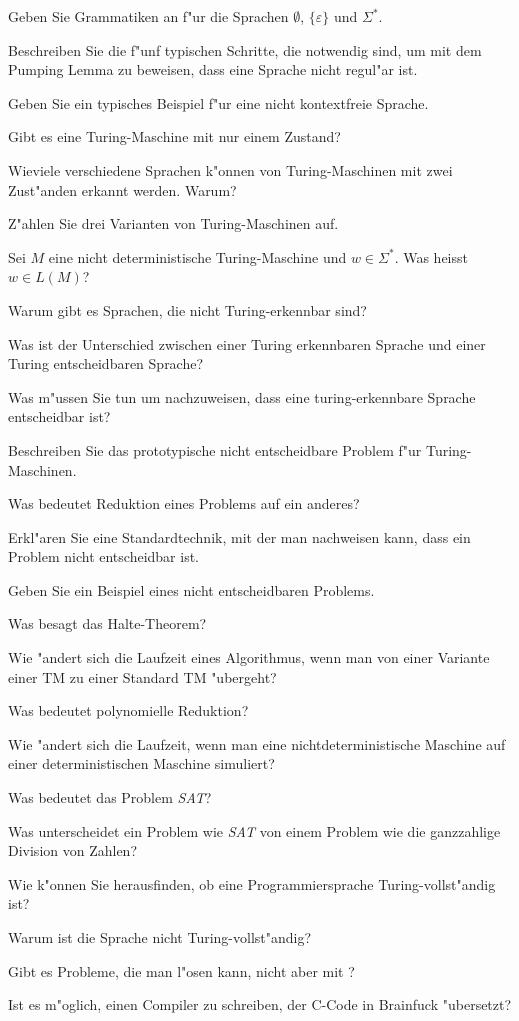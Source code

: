 \documentclass[a4paper,12pt,twocolumn]{article}
\begin{document}
\begin{compactenum}
\item Geben Sie Grammatiken an f"ur die Sprachen $\emptyset$,
$\{\varepsilon\}$ und $\Sigma^*$.
\item Beschreiben Sie die f"unf typischen Schritte, die notwendig sind,
um mit dem Pumping Lemma zu beweisen, dass eine Sprache nicht regul"ar ist.
\item Geben Sie ein typisches Beispiel f"ur eine nicht kontextfreie Sprache.
\item Gibt es eine Turing-Maschine mit nur einem Zustand?
\item Wieviele verschiedene Sprachen k"onnen von 
Turing-Maschinen mit zwei Zust"anden erkannt werden. Warum?
\item Z"ahlen Sie drei Varianten von Turing-Maschinen auf.
\item Sei $M$ eine nicht deterministische Turing-Maschine und $w\in\Sigma^*$.
Was heisst $w\in L(M)$?
\item Warum gibt es Sprachen, die nicht Turing-erkennbar sind?
\item Was ist der Unterschied zwischen einer Turing erkennbaren Sprache
und einer Turing entscheidbaren Sprache?
\item Was m"ussen Sie tun um nachzuweisen, dass eine turing-erkennbare
Sprache entscheidbar ist?
\item Beschreiben Sie das prototypische nicht entscheidbare Problem f"ur
Turing-Maschinen.
\item Was bedeutet Reduktion eines Problems auf ein anderes?
\item Erkl"aren Sie eine Standardtechnik, mit der man nachweisen kann,
dass ein Problem nicht entscheidbar ist.
\item Geben Sie ein Beispiel eines nicht entscheidbaren Problems.
\item Was besagt das Halte-Theorem?
\item Wie "andert sich die Laufzeit eines Algorithmus, wenn man von einer
Variante einer TM zu einer Standard TM "ubergeht?
\item Was bedeutet polynomielle Reduktion?
\item Wie "andert sich die Laufzeit, wenn man eine nichtdeterministische
Maschine auf einer deterministischen Maschine simuliert?
\item Was bedeutet das Problem \textsl{SAT}?
\item Was unterscheidet ein Problem wie \textsl{SAT} von einem Problem wie
die ganzzahlige Division von Zahlen?
\item Wie k"onnen Sie herausfinden, ob eine Programmiersprache
Turing-vollst"andig ist?
\item Warum ist die Sprache  nicht Turing-vollst"andig?
\item Gibt es Probleme, die man  l"osen kann, nicht
aber mit ?
\item Ist es m"oglich, einen Compiler zu schreiben, der C-Code in 
Brainfuck "ubersetzt?
\end{compactenum}
\end{document}
